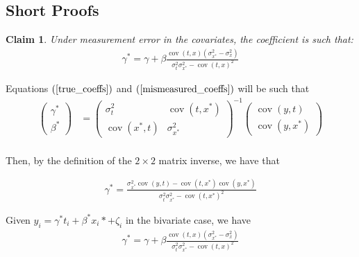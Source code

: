 \documentclass[10pt]{article}
\makeatletter
\newtheorem{claim}{Claim}
\renewenvironment{proof}[1][\proofname] {\par\pushQED{\qed}\normalfont\topsep6\p@\@plus6\p@\relax\trivlist\item[\hskip\labelsep\bfseries#1\@addpunct{.}]\ignorespaces}{\popQED\endtrivlist\@endpefalse}
\makeatother
\begin{document}
	\subsection*{Short Proofs}

        \setcounter{claim}{0}
        \setcounter{claimproof}{0}

            \begin{claim} \label{claim_one_with_proof}
            Under measurement error in the covariates, the coefficient is such that:
            \begin{align*}
                    \gamma^* = \gamma + \beta\frac{\operatorname{cov}(t,x)(\sigma^2_{x^*}-\sigma^2_x)}{\sigma_{t}^2\sigma_{x^*}^2-\operatorname{cov}({t,x})^2}
                \end{align*}
            \end{claim}
            
        \begin{proof}

        Equations $(\ref{true_coeffs})$ and $(\ref{mismeasured_coeffs})$ will be such that
        \begin{align*}
                \left(\begin{array}{l}
            {\gamma}^* \\
            {\beta}^*
            \end{array}\right)&=\left(\begin{array}{cc}
            {\sigma}^2_{t} & \operatorname{cov}({t,x^*}) \\
            \operatorname{cov}({x^*,t}) & {\sigma}_{x^*}^2
            \end{array}\right)^{-1}\left(\begin{array}{c}
            \operatorname{cov}{(y,t)} \\
            \operatorname{cov}{(y,x^*)}
            \end{array}\right) \\
        \end{align*}
                
        Then, by the definition of the $2 \times 2$ matrix inverse, we have that

        \begin{align*}
            {\gamma}^* =\frac{\sigma_{x^*}^2\operatorname{cov}{(y,t)}-\operatorname{cov}({t,x^*})\operatorname{cov}{(y,x^*)}}{\sigma_{t}^2\sigma_{x^*}^2-\operatorname{cov}({t,x^*})^2}
        \end{align*}

        Given $y_i = \gamma^* t_i +  \beta^*x_i* + \zeta_i$ in the bivariate case, we have
        \begin{align*}
            \gamma^* = \gamma + \beta\frac{\operatorname{cov}(t,x)(\sigma^2_{x^*}-\sigma^2_x)}{\sigma_{t}^2\sigma_{x^*}^2-\operatorname{cov}({t,x})^2}
        \end{align*}

        \end{proof}	
        
\end{document}

